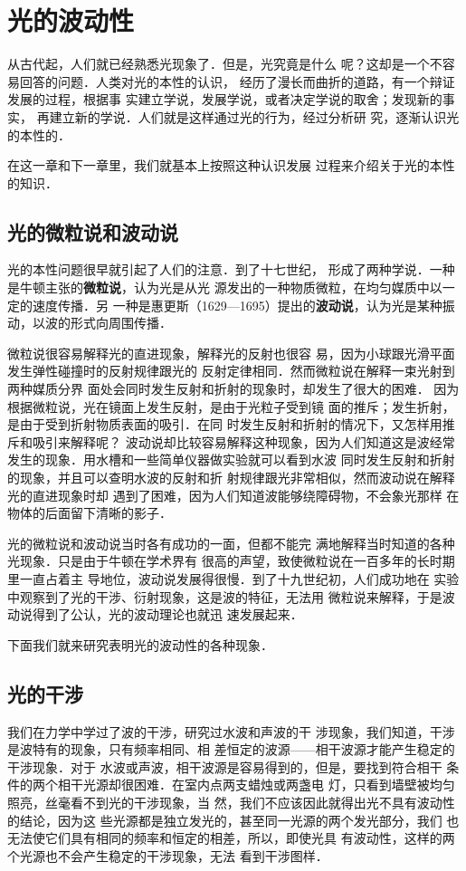 
\chapter{光的波动性}
从古代起，人们就已经熟悉光现象了．但是，光究竟是什么
呢？这却是一个不容易回答的问题．人类对光的本性的认识，
经历了漫长而曲折的道路，有一个辩证发展的过程，根据事
实建立学说，发展学说，或者决定学说的取舍；发现新的事实，
再建立新的学说．人们就是这样通过光的行为，经过分析研
究，逐渐认识光的本性的．

在这一章和下一章里，我们就基本上按照这种认识发展
过程来介绍关于光的本性的知识．

\section{光的微粒说和波动说}
光的本性问题很早就引起了人们的注意．到了十七世纪，
形成了两种学说．一种是牛顿主张的\textbf{微粒说}，认为光是从光
源发出的一种物质微粒，在均匀媒质中以一定的速度传播．另
一种是惠更斯（1629—1695）提出的\textbf{波动说}，认为光是某种振
动，以波的形式向周围传播．

微粒说很容易解释光的直进现象，解释光的反射也很容
易，因为小球跟光滑平面发生弹性碰撞时的反射规律跟光的
反射定律相同．然而微粒说在解释一束光射到两种媒质分界
面处会同时发生反射和折射的现象时，却发生了很大的困难．
因为根据微粒说，光在镜面上发生反射，是由于光粒子受到镜
面的推斥；发生折射，是由于受到折射物质表面的吸引．在同
时发生反射和折射的情况下，又怎样用推斥和吸引来解释呢？
波动说却比较容易解释这种现象，因为人们知道这是波经常
发生的现象．用水槽和一些简单仪器做实验就可以看到水波
同时发生反射和折射的现象，并且可以查明水波的反射和折
射规律跟光非常相似，然而波动说在解释光的直进现象时却
遇到了困难，因为人们知道波能够绕障碍物，不会象光那样
在物体的后面留下清晰的影子．

光的微粒说和波动说当时各有成功的一面，但都不能完
满地解释当时知道的各种光现象．只是由于牛顿在学术界有
很高的声望，致使微粒说在一百多年的长时期里一直占着主
导地位，波动说发展得很慢．到了十九世纪初，人们成功地在
实验中观察到了光的干涉、衍射现象，这是波的特征，无法用
微粒说来解释，于是波动说得到了公认，光的波动理论也就迅
速发展起来．

下面我们就来研究表明光的波动性的各种现象．

\section{光的干涉}
我们在力学中学过了波的干涉，研究过水波和声波的干
涉现象，我们知道，干涉是波特有的现象，只有频率相同、相
差恒定的波源——相干波源才能产生稳定的干涉现象．对于
水波或声波，相干波源是容易得到的，但是，要找到符合相干
条件的两个相干光源却很困难．在室内点两支蜡烛或两盏电
灯，只看到墙壁被均匀照亮，丝毫看不到光的干涉现象，当
然，我们不应该因此就得出光不具有波动性的结论，因为这
些光源都是独立发光的，甚至同一光源的两个发光部分，我们
也无法使它们具有相同的频率和恒定的相差，所以，即使光具
有波动性，这样的两个光源也不会产生稳定的干涉现象，无法
看到干涉图样．

